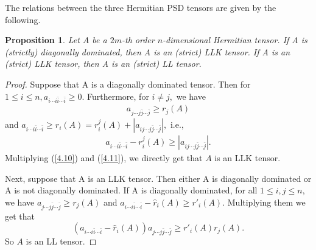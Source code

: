 \documentclass[10pt,reqno]{amsart}
\newtheorem{prop}[thm]{Proposition}
\theoremstyle{definition}
\begin{document}
The relations between the three Hermitian PSD tensors are given by the following.
\begin{prop}
Let $A$ be a $2m$-th order $n$-dimensional Hermitian tensor. If A is (strictly) diagonally dominated, then A is an (strict) LLK tensor. If A is an (strict) LLK tensor, then A is an (strict) LL tensor.
	\end{prop}
\begin{proof}
Suppose that A is a diagonally dominated tensor. Then for $1\leq i\leq n, a_{i\cdots i\bar{i}\cdots\bar{i}}\geq 0.$ Furthermore, for $i\neq j,$  we have
\begin{align} a_{j\cdots j\bar{j}\cdots\bar{j}}\geq r_{j}(A) \label{4.10}\end{align} and
$a_{i\cdots i\bar{i}\cdots\bar{i}}\geq r_{i}(A)=r_{i}^{j}(A)+|a_{ij\cdots j\bar{j}\cdots \bar{j}}|,$
i.e., \begin{align}  a_{i\cdots i\bar{i}\cdots\bar{i}}-r_{i}^{j}(A)\geq |a_{ij\cdots j\bar{j}\cdots \bar{j}}|.\label{4.11}\end{align}
Multiplying (\ref{4.10}) and (\ref{4.11}), we directly get that $A$ is an LLK tensor.

Next, suppose that A is an LLK tensor. Then either A is diagonally dominated or A is not diagonally dominated.
If A is diagonally dominated, for all $1\leq i, j\leq n$, we have
$a_{j\cdots j\bar{j}\cdots\bar{j}}\geq r_{j}(A)$ and
$a_{i\cdots i\bar{i}\cdots\bar{i}}-\hat{r}_{i}(A)\geq r'_{i}(A).$
Multiplying them we get that $$(a_{i\cdots i\bar{i}\cdots\bar{i}}-\hat{r}_{i}(A))a_{j\cdots j\bar{j}\cdots\bar{j}}\geq r'_{i}(A)r_{j}(A).$$
So $A$ is an LL tensor.


\end{proof}
\end{document}

